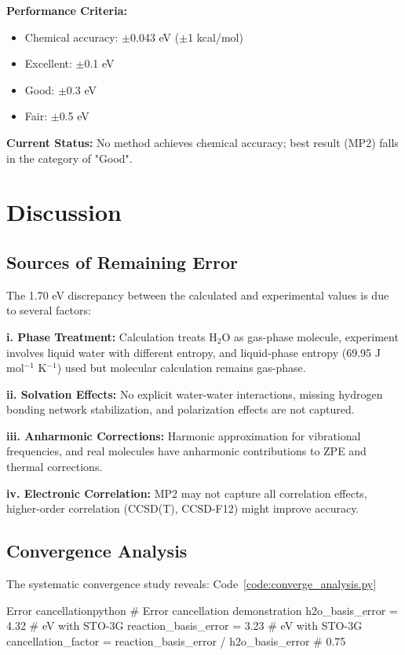 \documentclass{template}
\begin{document}
\textbf{Performance Criteria:}
\begin{itemize}
\item Chemical accuracy: $\pm$0.043 eV ($\pm$1 kcal/mol)
\item Excellent: $\pm$0.1 eV
\item Good: $\pm$0.3 eV
\item Fair: $\pm$0.5 eV
\end{itemize}

\textbf{Current Status:} No method achieves chemical accuracy; best result (MP2) falls in the category of "Good".

\section{Discussion}

\subsection{Sources of Remaining Error}

The 1.70 eV discrepancy between the calculated and experimental values is due to several factors:

\textbf{i. Phase Treatment:} Calculation treats H$_2$O as gas-phase molecule, experiment involves liquid water with different entropy, and liquid-phase entropy (69.95 J mol$^{-1}$ K$^{-1}$) used but molecular calculation remains gas-phase.

\textbf{ii. Solvation Effects:} No explicit water-water interactions, missing hydrogen bonding network stabilization, and polarization effects are not captured.

\textbf{iii. Anharmonic Corrections:} Harmonic approximation for vibrational frequencies, and real molecules have anharmonic contributions to ZPE and thermal corrections.

\textbf{iv. Electronic Correlation:} MP2 may not capture all correlation effects, higher-order correlation (CCSD(T), CCSD-F12) might improve accuracy.

\subsection{Convergence Analysis}

The systematic convergence study reveals: Code~\ref{code:converge_analysis.py}
\begin{codebox}{Error cancellation}{python}
# Error cancellation demonstration
    h2o_basis_error = 4.32  # eV with STO-3G
    reaction_basis_error = 3.23  # eV with STO-3G
    cancellation_factor = reaction_basis_error / h2o_basis_error  # 0.75
\end{codebox}
\end{document}
